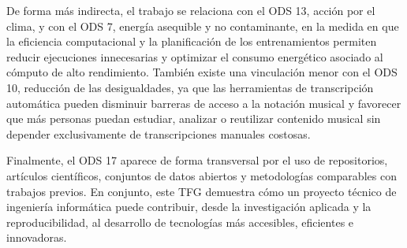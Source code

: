 \documentclass[11pt]{article}
\begin{document}
De forma más indirecta, el trabajo se relaciona con el ODS 13, acción por el clima, y con el ODS 7, energía asequible y no contaminante, en la medida en que la eficiencia computacional y la planificación de los entrenamientos permiten reducir ejecuciones innecesarias y optimizar el consumo energético asociado al cómputo de alto rendimiento. También existe una vinculación menor con el ODS 10, reducción de las desigualdades, ya que las herramientas de transcripción automática pueden disminuir barreras de acceso a la notación musical y favorecer que más personas puedan estudiar, analizar o reutilizar contenido musical sin depender exclusivamente de transcripciones manuales costosas.

Finalmente, el ODS 17 aparece de forma transversal por el uso de repositorios, artículos científicos, conjuntos de datos abiertos y metodologías comparables con trabajos previos. En conjunto, este TFG demuestra cómo un proyecto técnico de ingeniería informática puede contribuir, desde la investigación aplicada y la reproducibilidad, al desarrollo de tecnologías más accesibles, eficientes e innovadoras.
\end{document}
